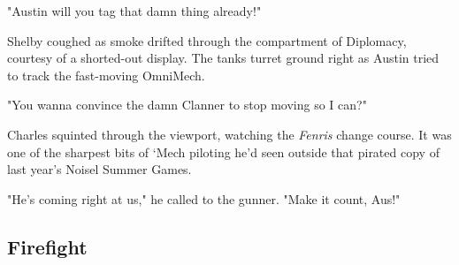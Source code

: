 "Austin will you tag that damn thing already!"

Shelby coughed as smoke drifted through the compartment of Diplomacy, courtesy of a shorted-out display.
The tanks turret ground right as Austin tried to track the fast-moving OmniMech.

"You wanna convince the damn Clanner to stop moving so I can?"

Charles squinted through the viewport, watching the \emph{Fenris} change course.
It was one of the sharpest bits of ‘Mech piloting he'd seen outside that pirated copy of last year's Noisel Summer Games.

"He's coming right at us," he called to the gunner. "Make it count, Aus!"


\newpage

\subsection{Firefight}

